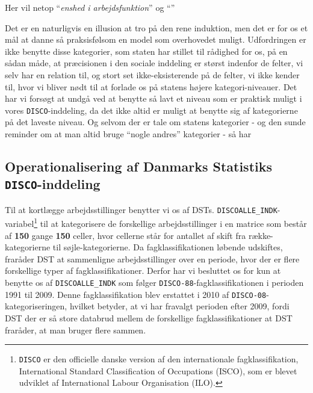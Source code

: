Her vil netop “\emph{enshed i arbejdsfunktion}” og “\emph{}”





Det er en naturligvis en illusion at tro på den rene induktion, men det er for os et mål at danne så praksisfølsom en model som overhovedet muligt. Udfordringen er ikke benytte disse kategorier, som staten har stillet til rådighed for os, på en sådan måde, at præcisionen i den sociale inddeling er størst indenfor de felter, vi selv har en relation til, og stort set ikke-eksisterende på de felter, vi ikke kender til, hvor vi bliver nødt til at forlade os på statens højere kategori-niveauer. Det har vi forsøgt at undgå ved at benytte så lavt et niveau som er praktisk muligt i vores \texttt{DISCO}-inddeling, da det ikke altid er muligt at benytte sig af kategorierne på det laveste niveau. Og selvom der er tale om statens kategorier - og den sunde reminder om at man altid bruge “nogle andres” kategorier - så har 








\subsection{Operationalisering af Danmarks Statistiks \texttt{DISCO}-inddeling} \label{disco_dst}

Til at kortlægge arbejdsstillinger benytter vi os af DSTs. \texttt{DISCOALLE\_INDK}-variabel\footnote{\texttt{DISCO} er den officielle danske version af den internationale fagklassifikation, International Standard Classification of Occupations (ISCO), som er blevet udviklet af International Labour Organisation (ILO).} til at kategorisere de forskellige arbejdsstillinger i en matrice som består af \textbf{150} gange \textbf{150} celler, hvor cellerne står for antallet af skift fra række-kategorierne til søjle-kategorierne. Da fagklassifikationen løbende udskiftes, fraråder DST at sammenligne arbejdsstillinger over en periode, hvor der er flere forskellige typer af fagklassifikationer. Derfor har vi besluttet os for kun at benytte os af \texttt{DISCOALLE\_INDK} som følger \texttt{DISCO-88}-fagklassifikationen i perioden 1991 til 2009. Denne fagklassifikation blev erstattet i 2010 af \texttt{DISCO-08}-kategoriseringen, hvilket betyder, at vi har fravalgt perioden efter 2009, fordi DST der er så store databrud mellem de forskellige fagklassifikationer at DST fraråder, at man bruger flere sammen.

